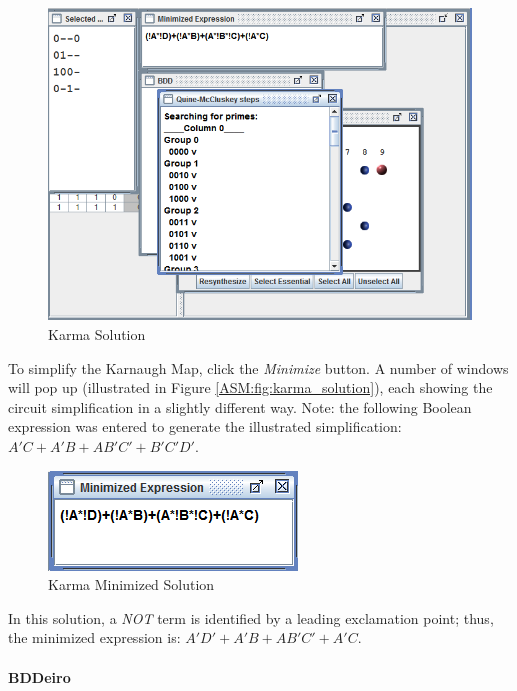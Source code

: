 \begin{figure}[H]
	\centering
	\includegraphics[width=\maxwidth{.95\linewidth}]{gfx/07_04}
	\caption{Karma Solution}
	\label{fig:07_04}
\end{figure}

To simplify the Karnaugh Map, click the \emph{Minimize} button. A number of windows will pop up (illustrated in Figure \ref{ASM:fig:karma_solution}), each showing the circuit simplification in a slightly different way. Note: the following Boolean expression was entered to generate the illustrated simplification: $ A'C + A'B + AB'C' + B'C'D' $. 

\begin{figure}[H]
	\centering
	\includegraphics[width=\maxwidth{.95\linewidth}]{gfx/07_05}
	\caption{Karma Minimized Solution}
	\label{fig:07_05}
\end{figure}


In this solution, a \emph{NOT} term is identified by a leading exclamation point; thus, the minimized expression is: $ A'D' + A'B + AB'C' + A'C $. 

\paragraph{BDDeiro}
\label{ASM:para:karma_bddeiro}

